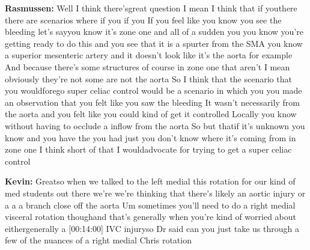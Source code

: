 \documentclass[
]{book}
\begin{document}
\textbf{Rasmussen:} Well I think there'sgreat question I mean I think that if
youthere there are scenarios where if you if you If you feel like you
know you see the bleeding let's sayyou know it's zone one and all of a
sudden you you know you're getting ready to do this and you see that it
is a spurter from the SMA you know a superior mesenteric artery and it
doesn't look like it's the aorta for example And because there's some
structures of course in zone one that aren't I mean obviously they're
not some are not the aorta So I think that the scenario that you
wouldforego super celiac control would be a scenario in which you you
made an observation that you felt like you saw the bleeding It wasn't
necessarily from the aorta and you felt like you could kind of get it
controlled Locally you know without having to occlude a inflow from the
aorta So but thatif it's unknown you know and you have the you had just
you don't know where it's coming from in zone one I think short of that
I wouldadvocate for trying to get a super celiac control

\textbf{Kevin:} Greatso when we talked to the left medial this rotation for
our kind of med students out there we're we're thinking that there's
likely an aortic injury or a a a branch close off the aorta Um sometimes
you'll need to do a right medial visceral rotation thoughand that's
generally when you're kind of worried about eithergenerally a {[}00:14:00{]}
IVC injuryso Dr said can you just take us through a few of the nuances
of a right medial Chris rotation
\end{document}
